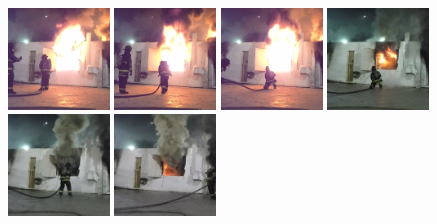 \documentclass[12pt,oneside]{book}
\begin{document}
\begin{figure}[H]
\centering
\includegraphics[width=0.24\textwidth]{../0_Images/Tactical_Considerations/Regrowth/10_Before}
\includegraphics[width=0.24\textwidth]{../0_Images/Tactical_Considerations/Regrowth/5_Before}
\includegraphics[width=0.24\textwidth]{../0_Images/Tactical_Considerations/Regrowth/At_supp}
\includegraphics[width=0.24\textwidth]{../0_Images/Tactical_Considerations/Regrowth/5_Sec_Post}
\includegraphics[width=0.24\textwidth]{../0_Images/Tactical_Considerations/Regrowth/10_Sec_Post}
\includegraphics[width=0.24\textwidth]{../0_Images/Tactical_Considerations/Regrowth/15_Sec_Post}

\end{figure}
\end{document}
